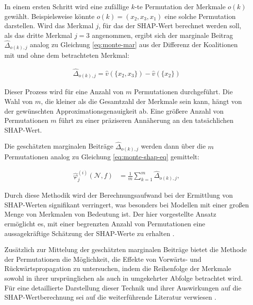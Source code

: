 In einem ersten Schritt wird eine zufällige $k$-te Permutation der Merkmale $o(k)$ gewählt.
Beispielsweise könnte $o(k) = (x_2, x_3, x_1)$ eine solche Permutation darstellen.
Wird das Merkmal $j$, für das der SHAP-Wert berechnet werden soll, als das dritte Merkmal $j=3$ angenommen, 
ergibt sich der marginale Beitrag $\hat{\Delta}_{o(k), j}$ analog zu Gleichung \ref{eq:monte-mar} 
aus der Differenz der Koalitionen mit und ohne dem betrachteten Merkmal:

\begin{align}
    \hat{\Delta}_{o(k), j} = \hat{v}(\{x_2, x_3\}) - \hat{v}(\{x_2\})
\end{align}

Dieser Prozess wird für eine Anzahl von $m$ Permutationen durchgeführt. Die Wahl von $m$,
die kleiner als die Gesamtzahl der Merkmale sein kann, hängt von der gewünschten Approximationsgenauigkeit
ab. Eine größere Anzahl von Permutationen $m$ führt zu einer präziseren Annäherung an den tatsächlichen SHAP-Wert.

Die geschätzten marginalen Beiträge $\hat{\Delta}_{o(k), j}$ werden dann über die $m$ Permutationen analog zu Gleichung
\ref{eq:monte-shap-eq} gemittelt:

\begin{align}
    \label{eq:permu-shap-eq}
    \hat{\varphi}^{(i)}_{j} (\mathcal{N}, f) &= \frac{1}{m}\sum_{k=1}^{m}\hat{\Delta}_{o(k), j},
\end{align}

Durch diese Methodik wird der Berechnungsaufwand bei der Ermittlung von SHAP-Werten 
signifikant verringert, was besonders bei Modellen mit einer großen Menge von Merkmalen von 
Bedeutung ist. Der hier vorgestellte Ansatz ermöglicht es, mit einer begrenzten Anzahl von 
Permutationen eine aussagekräftige Schätzung der SHAP-Werte zu erhalten \cite[S. 39]{Molnar_2023}.

Zusätzlich zur Mittelung der geschätzten marginalen Beiträge bietet die Methode der Permutationen 
die Möglichkeit, die Effekte von Vorwärts- und Rückwärtspropagation zu untersuchen, 
indem die Reihenfolge der Merkmale sowohl in ihrer ursprünglichen als auch in umgekehrter 
Abfolge betrachtet wird. Für eine detaillierte Darstellung dieser Technik und ihrer 
Auswirkungen auf die SHAP-Wertberechnung sei auf die weiterführende Literatur verwiesen \cite[S. 39f]{Molnar_2023}.
                                         